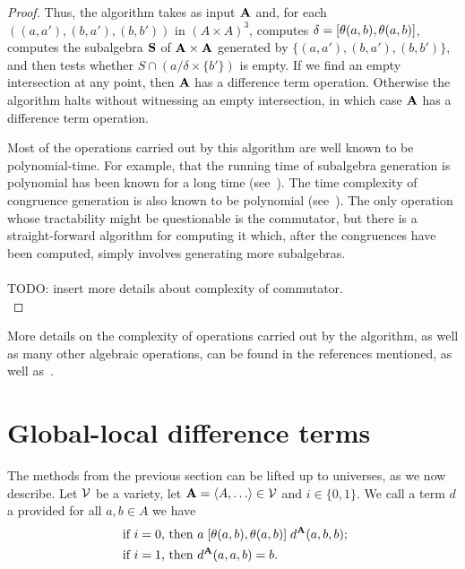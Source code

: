 \begin{proof}
    Thus, the algorithm takes as input $\mathbf{A}$ and, for each 
    $((a,a'), (b,a'), (b,b'))$ in $(A\times A)^3$, computes
    $\delta = [\theta(a,b), \theta(a,b)]$, computes the subalgebra
    $\mathbf{S}$ of $\mathbf{A}\times \mathbf{A}$ generated by
    $\{(a,a'), (b,a'), (b,b')\}$, and then
    tests whether $S \cap (a/\delta \times \{b'\})$ is empty.
    If we find an empty intersection at any point, then
    $\mathbf{A}$ has a difference term operation.
    Otherwise the algorithm halts without witnessing an empty
    intersection, in which case $\mathbf{A}$ has a difference term operation.

    Most of the operations carried out by this algorithm are well known to be
    polynomial-time.  For example, that the running time of subalgebra generation is
    polynomial has been known for a long time (see~\cite{MR0455543}).
    The time complexity of congruence generation is also known to be polynomial
    (see~\cite{MR2470585}).  The only operation whose tractability might be 
    questionable is the commutator, but there is a straight-forward algorithm for
    computing it which, after the congruences have been computed, simply
    involves generating more subalgebras.
    \\\\
    TODO: insert more details about complexity of commutator.\\
\end{proof}


More details on the complexity of operations carried out by the algorithm, as well as many other algebraic operations, can be found in the references mentioned, as well as~\cite{MR1871085,MR1695293,Freese:2009}. 


\section{Global-local difference terms}
\label{sec:glob-local-diff}
The methods from the previous section can be lifted
up to universes, as we now describe.
Let $\mathcal{V}$ be a variety, let $\bA = \<A, \dots\> \in \sV$ 
and $i\in \{0,1\}$.
We call a term $d$ a 
provided for all $a, b\in A$  we have
\begin{align}
\text{ if $i=0$, then } & a \comm{\theta(a,b)}{\theta(a,b)} d^{\bA}(a,b,b);
\label{eq:global-diff-triple}\\
\text{ if $i=1$, then } &
d^{\bA}(a,a,b) = b. 
\end{align}

